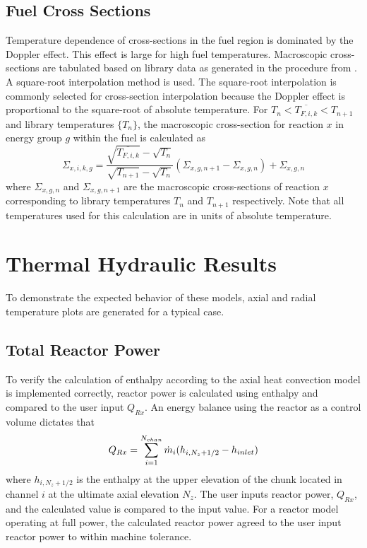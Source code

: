   \subsection{Fuel Cross Sections}
    Temperature dependence of cross-sections in the fuel region is dominated
    by the Doppler effect. This effect is large for high fuel temperatures.
    Macroscopic cross-sections are tabulated based on library data as generated 
    in the procedure from . A square-root 
    interpolation method is used. The square-root interpolation is commonly 
    selected for cross-section interpolation because the Doppler effect is 
    proportional to the square-root of absolute temperature. For 
    ${T_n < \overline{T_{F,i,k}} < T_{n+1}}$ and library temperatures $\{T_n\}$,
    the macroscopic cross-section for reaction $x$ in energy group $g$ within 
    the fuel is calculated as
    \begin{equation}
      \Sigma_{x,i,k,g} = 
        \frac{\sqrt{\overline{T_{F,i,k}}} - \sqrt{T_{n}}}
        {\sqrt{T_{n+1}}-\sqrt{T_{n}}}
        (\Sigma_{x,g,n+1} - \Sigma_{x,g,n})  + \Sigma_{x,g,n}
    \end{equation}
    where $\Sigma_{x,g,n}$ and $\Sigma_{x,g,n+1}$ are the macroscopic
    cross-sections of reaction $x$ corresponding to library temperatures $T_n$
    and $T_{n+1}$ respectively. Note that all temperatures used for this 
    calculation are in units of absolute temperature.
      
\section{Thermal Hydraulic Results}
  To demonstrate the expected behavior of these models, axial and radial
  temperature plots are generated for a typical case. 
  
  \subsection{Total Reactor Power}
    To verify the calculation of enthalpy according to the axial heat convection
    model is implemented correctly, reactor power is calculated using enthalpy
    and compared to the user input $Q_{Rx}$. An energy balance using the reactor
    as a control volume dictates that
    \begin{equation}
      \label{eq:reactor_energy_balance}
      Q_{Rx} = \sum_{i=1}^{N_{chan}} \dot{m}_i (h_{i,N_z+1/2} - h_{inlet})
    \end{equation}
    where $h_{i,N_z+1/2}$ is the enthalpy at the upper elevation of the chunk
    located in channel $i$ at the ultimate axial elevation $N_z$. The user
    inputs reactor power, $Q_{Rx}$, and the calculated value is compared to the
    input value. For a reactor model operating at full power, the calculated
    reactor power agreed to the user input reactor power to within machine
    tolerance.

